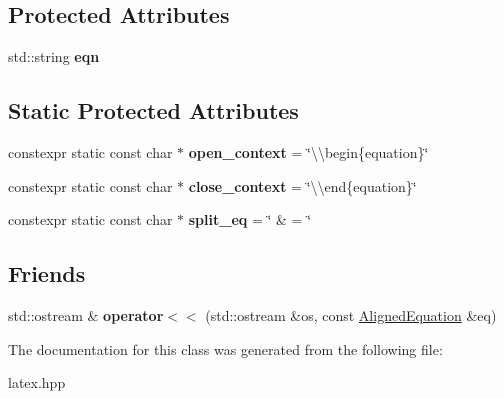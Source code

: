 \subsection*{Protected Attributes}
\begin{DoxyCompactItemize}
\item 
\hypertarget{classlatex_1_1math_1_1AlignedEquation_a5d23378f8a75c041181f62d104670fee}{std\-::string {\bfseries eqn}}\label{classlatex_1_1math_1_1AlignedEquation_a5d23378f8a75c041181f62d104670fee}

\end{DoxyCompactItemize}
\subsection*{Static Protected Attributes}
\begin{DoxyCompactItemize}
\item 
\hypertarget{classlatex_1_1math_1_1AlignedEquation_a19c23a2c3f908d8d167969cd88efef72}{constexpr static const char $\ast$ {\bfseries open\-\_\-context} = \char`\"{}\textbackslash{}\textbackslash{}begin\{equation\}\char`\"{}}\label{classlatex_1_1math_1_1AlignedEquation_a19c23a2c3f908d8d167969cd88efef72}

\item 
\hypertarget{classlatex_1_1math_1_1AlignedEquation_a34eb2b78f0667208d92f61be226cf335}{constexpr static const char $\ast$ {\bfseries close\-\_\-context} = \char`\"{}\textbackslash{}\textbackslash{}end\{equation\}\char`\"{}}\label{classlatex_1_1math_1_1AlignedEquation_a34eb2b78f0667208d92f61be226cf335}

\item 
\hypertarget{classlatex_1_1math_1_1AlignedEquation_a664278f69a33046287403d1bdff81327}{constexpr static const char $\ast$ {\bfseries split\-\_\-eq} = \char`\"{} \& = \char`\"{}}\label{classlatex_1_1math_1_1AlignedEquation_a664278f69a33046287403d1bdff81327}

\end{DoxyCompactItemize}
\subsection*{Friends}
\begin{DoxyCompactItemize}
\item 
\hypertarget{classlatex_1_1math_1_1AlignedEquation_a82ee5c4bf9b60a6704901092d287d3c7}{std\-::ostream \& {\bfseries operator$<$$<$} (std\-::ostream \&os, const \hyperlink{classlatex_1_1math_1_1AlignedEquation}{Aligned\-Equation} \&eq)}\label{classlatex_1_1math_1_1AlignedEquation_a82ee5c4bf9b60a6704901092d287d3c7}

\end{DoxyCompactItemize}


The documentation for this class was generated from the following file\-:\begin{DoxyCompactItemize}
\item 
latex.\-hpp\end{DoxyCompactItemize}
